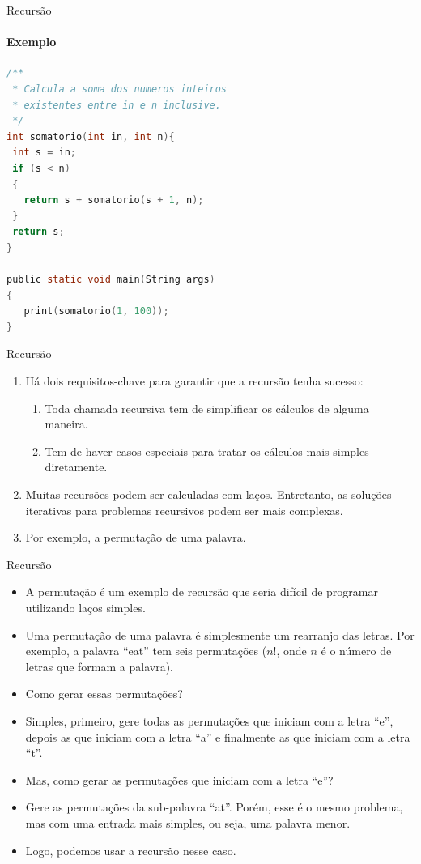 \begin{frame}[fragile]{Recursão}
\framesubtitle{Exemplo}
\footnotesize
\begin{lstlisting}[language=C]
/**
 * Calcula a soma dos numeros inteiros 
 * existentes entre in e n inclusive.
 */
int somatorio(int in, int n){   
 int s = in;
 if (s < n)
 {      
   return s + somatorio(s + 1, n);
 }
 return s;
}

public static void main(String args)
{    
   print(somatorio(1, 100));
}
\end{lstlisting}
\end{frame}


\begin{frame}[fragile]{Recursão}
\begin{enumerate}
	\item Há dois requisitos-chave para garantir que a recursão tenha sucesso:	
			\begin{enumerate}
				\item Toda chamada recursiva tem de simplificar os cálculos de alguma maneira.
				\item Tem de haver casos especiais para tratar os cálculos mais simples diretamente.
			\end{enumerate}
	\item Muitas recursões podem ser calculadas com laços. Entretanto, as soluções iterativas para problemas recursivos podem ser mais complexas.
	\item Por exemplo, a permutação de uma palavra.
\end{enumerate}
\end{frame}

\begin{frame}[fragile]{Recursão}
\begin{itemize}
	\item A permutação é um exemplo de recursão que seria difícil de programar utilizando laços simples.
	\item Uma permutação de uma palavra é simplesmente um rearranjo das letras. Por exemplo, a palavra ``eat'' tem seis permutações ($n!$, onde $n$ é o número de letras que formam a palavra).
	\item Como gerar essas permutações?
	\item Simples, primeiro, gere todas as permutações que iniciam com a letra ``e'', depois as que iniciam com a letra ``a'' e finalmente as que iniciam com a letra ``t''.
	\item Mas, como gerar as permutações que iniciam com a letra ``e''?
	\item Gere as permutações da sub-palavra ``at''. Porém, esse é o mesmo problema, mas com uma entrada mais simples, ou seja, uma palavra menor.
	\item Logo, podemos usar a recursão nesse caso.
\end{itemize}
\end{frame}


